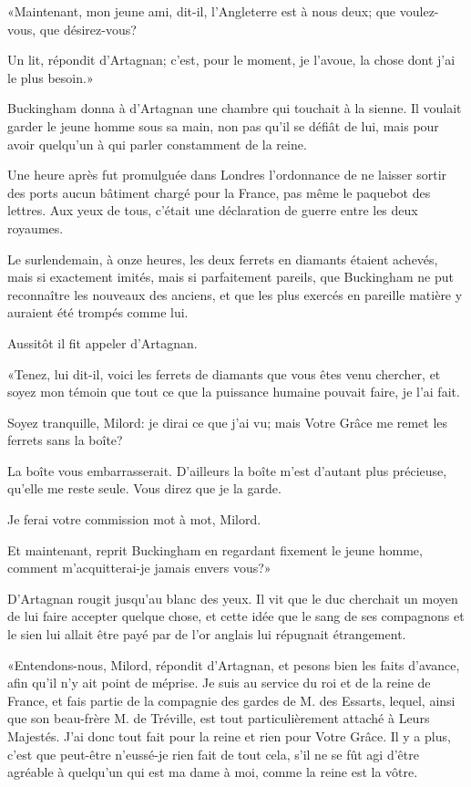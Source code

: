 «Maintenant, mon jeune ami, dit-il, l'Angleterre est à nous deux; que voulez-vous, que désirez-vous? 

\speak  Un lit, répondit d'Artagnan; c'est, pour le moment, je l'avoue, la chose dont j'ai le plus besoin.» 

Buckingham donna à d'Artagnan une chambre qui touchait à la sienne. Il voulait garder le jeune homme sous sa main, non pas qu'il se défiât de lui, mais pour avoir quelqu'un à qui parler constamment de la reine. 

Une heure après fut promulguée dans Londres l'ordonnance de ne laisser sortir des ports aucun bâtiment chargé pour la France, pas même le paquebot des lettres. Aux yeux de tous, c'était une déclaration de guerre entre les deux royaumes. 

Le surlendemain, à onze heures, les deux ferrets en diamants étaient achevés, mais si exactement imités, mais si parfaitement pareils, que Buckingham ne put reconnaître les nouveaux des anciens, et que les plus exercés en pareille matière y auraient été trompés comme lui. 

Aussitôt il fit appeler d'Artagnan. 

«Tenez, lui dit-il, voici les ferrets de diamants que vous êtes venu chercher, et soyez mon témoin que tout ce que la puissance humaine pouvait faire, je l'ai fait. 

\speak  Soyez tranquille, Milord: je dirai ce que j'ai vu; mais Votre Grâce me remet les ferrets sans la boîte? 

\speak  La boîte vous embarrasserait. D'ailleurs la boîte m'est d'autant plus précieuse, qu'elle me reste seule. Vous direz que je la garde. 

\speak  Je ferai votre commission mot à mot, Milord. 

\speak  Et maintenant, reprit Buckingham en regardant fixement le jeune homme, comment m'acquitterai-je jamais envers vous?» 

D'Artagnan rougit jusqu'au blanc des yeux. Il vit que le duc cherchait un moyen de lui faire accepter quelque chose, et cette idée que le sang de ses compagnons et le sien lui allait être payé par de l'or anglais lui répugnait étrangement. 

«Entendons-nous, Milord, répondit d'Artagnan, et pesons bien les faits d'avance, afin qu'il n'y ait point de méprise. Je suis au service du roi et de la reine de France, et fais partie de la compagnie des gardes de M. des Essarts, lequel, ainsi que son beau-frère M. de Tréville, est tout particulièrement attaché à Leurs Majestés. J'ai donc tout fait pour la reine et rien pour Votre Grâce. Il y a plus, c'est que peut-être n'eussé-je rien fait de tout cela, s'il ne se fût agi d'être agréable à quelqu'un qui est ma dame à moi, comme la reine est la vôtre. 

